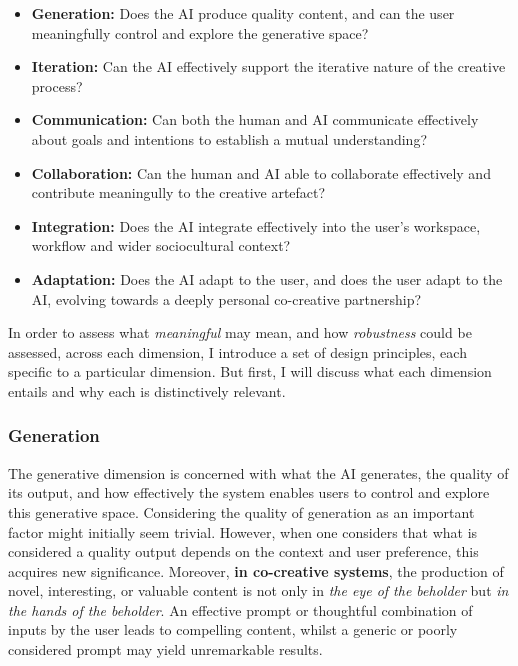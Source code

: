 \begin{itemize}
    \item \textbf{Generation: }Does the AI produce quality content, and can the user meaningfully control and explore the generative space?
    \item \textbf{Iteration: }Can the AI effectively support the iterative nature of the creative process?
    \item \textbf{Communication:} Can both the human and AI communicate effectively about goals and intentions to establish a mutual understanding?
    \item \textbf{Collaboration:} Can the human and AI able to collaborate effectively and contribute meaningully to the creative artefact?
    \item \textbf{Integration:} Does the AI integrate effectively into the user’s workspace, workflow and wider sociocultural context?
    \item \textbf{Adaptation:} Does the AI adapt to the user, and does the user adapt to the AI, evolving towards a deeply personal co-creative partnership?
\end{itemize}

In order to assess what \textit{meaningful} may mean, and how \textit{robustness} could be assessed, across each dimension, I introduce a set of design principles, each specific to a particular dimension. But first, I will discuss what each dimension entails and why each is distinctively relevant. 

\subsubsection{Generation}

The generative dimension is concerned with what the AI generates, the quality of its output, and how effectively the system enables users to control and explore this generative space. Considering the quality of generation as an important factor might initially seem trivial. However, when one considers that what is considered a quality output depends on the context and user preference, this acquires new significance. Moreover, \textbf{in co-creative systems}, the production of novel, interesting, or valuable content is not only in \textit{the eye of the beholder} but \textit{in the hands of the beholder}. An effective prompt or thoughtful combination of inputs by the user leads to compelling content, whilst a generic or poorly considered prompt may yield unremarkable results.

